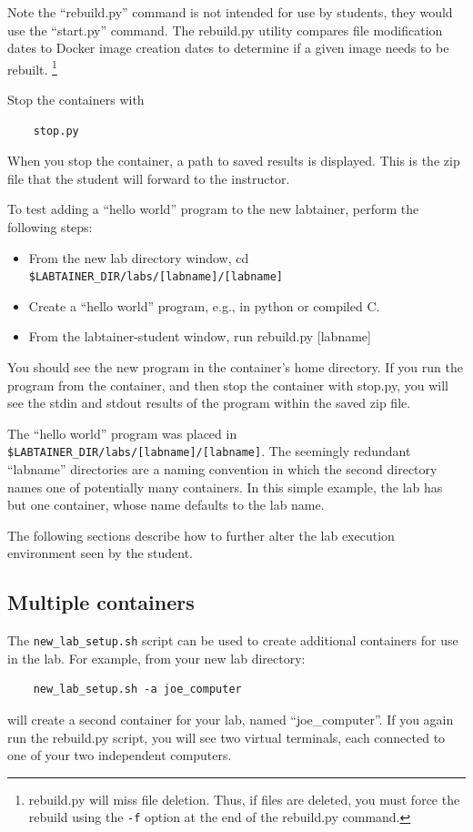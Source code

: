 \documentclass[12pt]{article}
\begin{document}
Note the ``rebuild.py'' command is not intended for use by students, they would use the ``start.py'' command.  
The rebuild.py utility compares file modification dates to Docker image creation dates to determine if
a given image needs to be rebuilt.  \footnote{rebuild.py will miss file deletion.  Thus, if files are deleted, you must
force the rebuild using the {\tt -f} option at the end of the rebuild.py command.}

Stop the containers with 
\begin{verbatim}
    stop.py 
\end{verbatim}
When you stop the container, a path to saved results is displayed.
This is the zip file that the student will forward to the instructor.

To test adding a ``hello world'' program to the new labtainer, perform the following steps:
\begin{itemize}
\item From the new lab directory window, cd \verb!$LABTAINER_DIR/labs/[labname]/[labname]!
\item Create a ``hello world'' program, e.g., in python or compiled C.
\item From the labtainer-student window, run rebuild.py [labname]
\end{itemize}
    
You should see the new program in the container's
home directory.  If you run the program from the container, and then stop the container
with stop.py, you will see the stdin and stdout results of the program within the
saved zip file.

The ``hello world'' program was placed in \verb!$LABTAINER_DIR/labs/[labname]/[labname]!.
The seemingly redundant ``labname'' directories are a naming convention in which the
second directory names one of potentially many containers.  In this simple example,
the lab has but one container, whose name defaults to the lab name.

The following sections describe how to further alter the lab execution environment seen by 
the student.

\subsection {Multiple containers}
The {\tt new\_lab\_setup.sh} script can be used to create additional containers for use
in the lab.  For example, from your new lab directory:
\begin{verbatim}
    new_lab_setup.sh -a joe_computer
\end{verbatim}
\noindent will create a second container for your lab,
named ``joe\_computer''.  If you again run the rebuild.py script, you will see two virtual
terminals, each connected to one of your two independent computers. 
\end{document}
